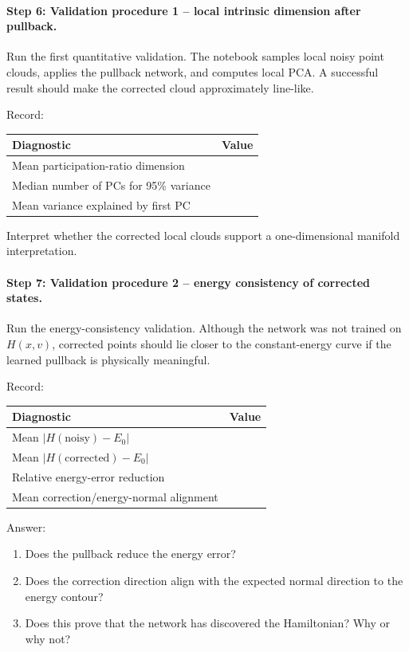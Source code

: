 \documentclass[11pt]{article}
\begin{document}
\paragraph{Step 6: Validation procedure 1 -- local intrinsic dimension after pullback.}
Run the first quantitative validation. The notebook samples local noisy point clouds, applies the pullback network, and computes local PCA. A successful result should make the corrected cloud approximately line-like.

Record:
\begin{center}
\begin{tabular}{l l}
\hline
Diagnostic & Value \\
\hline
Mean participation-ratio dimension & \\
Median number of PCs for 95\% variance & \\
Mean variance explained by first PC & \\
\hline
\end{tabular}
\end{center}

Interpret whether the corrected local clouds support a one-dimensional manifold interpretation.

\paragraph{Step 7: Validation procedure 2 -- energy consistency of corrected states.}
Run the energy-consistency validation. Although the network was not trained on \(H(x,v)\), corrected points should lie closer to the constant-energy curve if the learned pullback is physically meaningful.

Record:
\begin{center}
\begin{tabular}{l l}
\hline
Diagnostic & Value \\
\hline
Mean \(|H(\mathrm{noisy})-E_0|\) & \\
Mean \(|H(\mathrm{corrected})-E_0|\) & \\
Relative energy-error reduction & \\
Mean correction/energy-normal alignment & \\
\hline
\end{tabular}
\end{center}

Answer:
\begin{enumerate}
    \item Does the pullback reduce the energy error?
    \item Does the correction direction align with the expected normal direction to the energy contour?
    \item Does this prove that the network has discovered the Hamiltonian? Why or why not?
\end{enumerate}
\end{document}
